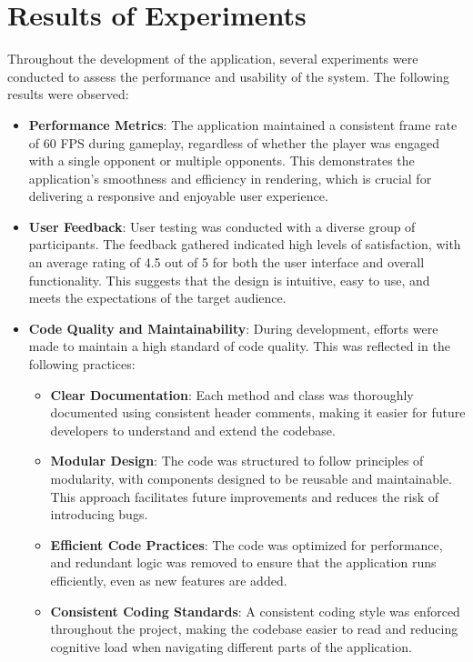 \section{Results of Experiments}

Throughout the development of the application, several experiments were conducted to assess the performance and usability of the system. The following results were observed:

\begin{itemize}
   \item \textbf{Performance Metrics}: The application maintained a consistent frame rate of 60 FPS during gameplay, regardless of whether the player was engaged with a single opponent or multiple opponents. This demonstrates the application's smoothness and efficiency in rendering, which is crucial for delivering a responsive and enjoyable user experience.
   
   \item \textbf{User Feedback}: User testing was conducted with a diverse group of participants. The feedback gathered indicated high levels of satisfaction, with an average rating of 4.5 out of 5 for both the user interface and overall functionality. This suggests that the design is intuitive, easy to use, and meets the expectations of the target audience.
   
   \item \textbf{Code Quality and Maintainability}: During development, efforts were made to maintain a high standard of code quality. This was reflected in the following practices:
   \begin{itemize}
       \item \textbf{Clear Documentation}: Each method and class was thoroughly documented using consistent header comments, making it easier for future developers to understand and extend the codebase.
       \item \textbf{Modular Design}: The code was structured to follow principles of modularity, with components designed to be reusable and maintainable. This approach facilitates future improvements and reduces the risk of introducing bugs.
       \item \textbf{Efficient Code Practices}: The code was optimized for performance, and redundant logic was removed to ensure that the application runs efficiently, even as new features are added.
       \item \textbf{Consistent Coding Standards}: A consistent coding style was enforced throughout the project, making the codebase easier to read and reducing cognitive load when navigating different parts of the application.
   \end{itemize}
\end{itemize}

